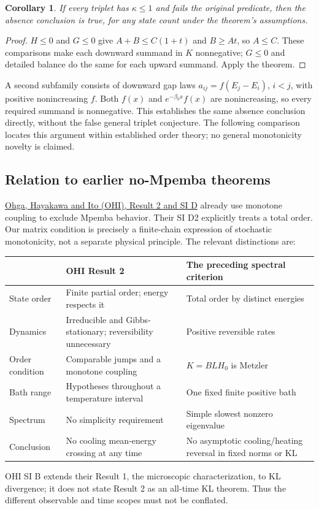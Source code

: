 \documentclass[11pt]{article}
\newtheorem{corollary}{Corollary}
\begin{document}
\begin{corollary}
If every triplet has $\kappa\leq1$ and fails the original predicate, then the absence conclusion is true, for any state count under the theorem's assumptions.
\end{corollary}
\begin{proof}
$H\leq0$ and $G\leq0$ give $A+B\leq C(1+t)$ and $B\geq At$, so $A\leq C$. These comparisons make each downward summand in $K$ nonnegative; $G\leq0$ and detailed balance do the same for each upward summand. Apply the theorem.
\end{proof}
A second subfamily consists of downward gap laws $a_{ij}=f(E_j-E_i)$, $i<j$, with positive nonincreasing $f$. Both $f(x)$ and $e^{-\beta_bx}f(x)$ are nonincreasing, so every required summand is nonnegative. This establishes the same absence conclusion directly, without the false general triplet conjecture. The following comparison locates this argument within established order theory; no general monotonicity novelty is claimed.

\subsection{Relation to earlier no-Mpemba theorems}\label{sec:priororder}
\href{https://arxiv.org/html/2410.06623v2}{Ohga, Hayakawa and Ito (OHI), Result 2 and SI D} already use monotone coupling to exclude Mpemba behavior. Their SI D2 explicitly treats a total order. Our matrix condition is precisely a finite-chain expression of stochastic monotonicity, not a separate physical principle. The relevant distinctions are:
\begin{center}\small
\begin{tabular}{p{}p{}p{}}
\toprule &OHI Result 2&The preceding spectral criterion\\\midrule
State order&Finite partial order; energy respects it&Total order by distinct energies\\
Dynamics&Irreducible and Gibbs-stationary; reversibility unnecessary&Positive reversible rates\\
Order condition&Comparable jumps and a monotone coupling&$K=BLH_0$ is Metzler\\
Bath range&Hypotheses throughout a temperature interval&One fixed finite positive bath\\
Spectrum&No simplicity requirement&Simple slowest nonzero eigenvalue\\
Conclusion&No cooling mean-energy crossing at any time&No asymptotic cooling/heating reversal in fixed norms or KL\\\bottomrule
\end{tabular}
\end{center}
OHI SI B extends their Result 1, the microscopic characterization, to KL divergence; it does not state Result 2 as an all-time KL theorem. Thus the different observable and time scopes must not be conflated.
\end{document}
